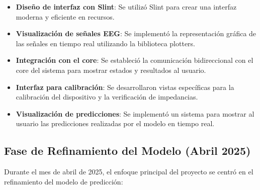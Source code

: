\begin{itemize}
    \item \textbf{Diseño de interfaz con Slint}: Se utilizó Slint para crear una interfaz moderna y eficiente en recursos.
    
    \item \textbf{Visualización de señales EEG}: Se implementó la representación gráfica de las señales en tiempo real utilizando la biblioteca plotters.
    
    \item \textbf{Integración con el core}: Se estableció la comunicación bidireccional con el core del sistema para mostrar estados y resultados al usuario.
    
    \item \textbf{Interfaz para calibración}: Se desarrollaron vistas específicas para la calibración del dispositivo y la verificación de impedancias.
    
    \item \textbf{Visualización de predicciones}: Se implementó un sistema para mostrar al usuario las predicciones realizadas por el modelo en tiempo real.
\end{itemize}

\subsection{Fase de Refinamiento del Modelo (Abril 2025)}

Durante el mes de abril de 2025, el enfoque principal del proyecto se centró en el refinamiento del modelo de predicción:

